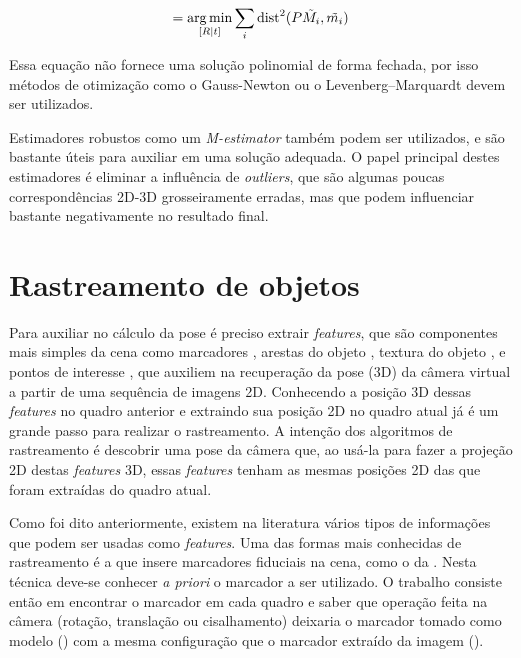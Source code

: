 \begin{equation}
[R | t] = \argmin_{[R | t]} \sum_i \text{dist}^2(P\tilde{M_i}, \tilde{m_i})
\label{calculo_pose}
\end{equation}

Essa equação não fornece uma solução polinomial de forma fechada, por isso métodos de otimização como o Gauss-Newton \cite{gauss_newton} ou o Levenberg–Marquardt \cite{levenberg} devem ser utilizados.

Estimadores robustos como um \emph{M-estimator} \cite{lepetit} também podem ser utilizados, e são bastante úteis para auxiliar em uma solução adequada. O papel principal destes estimadores é eliminar a influência de \emph{outliers}, que são algumas poucas correspondências 2D-3D grosseiramente erradas, mas que podem influenciar bastante negativamente no resultado final.

\section{Rastreamento de objetos}

Para auxiliar no cálculo da pose é preciso extrair \emph{features}, que são componentes mais simples da cena como marcadores \cite{roberto2012mestrado}, arestas do objeto \cite{teichrieb2007survey}, textura do objeto \cite{mestradochico}, e pontos de interesse \cite{mestradochico}, que auxiliem na recuperação da pose (3D) da câmera virtual a partir de uma sequência de imagens 2D. Conhecendo a posição 3D dessas \emph{features} no quadro anterior e extraindo sua posição 2D no quadro atual já é um grande passo para realizar o rastreamento. A intenção dos algoritmos de rastreamento é descobrir uma pose da câmera que, ao usá-la para fazer a projeção 2D destas \emph{features} 3D, essas \emph{features} tenham as mesmas posições 2D das que foram extraídas do quadro atual.

Como foi dito anteriormente, existem na literatura vários tipos de informações que podem ser usadas como \emph{features}. Uma das formas mais conhecidas de rastreamento é a que insere marcadores fiduciais na cena, como o da . Nesta técnica deve-se conhecer \emph{a priori} o marcador a ser utilizado. O trabalho consiste então em encontrar o marcador em cada quadro e saber que operação feita na câmera (rotação, translação ou cisalhamento) deixaria o marcador tomado como modelo () com a mesma configuração que o marcador extraído da imagem ().

